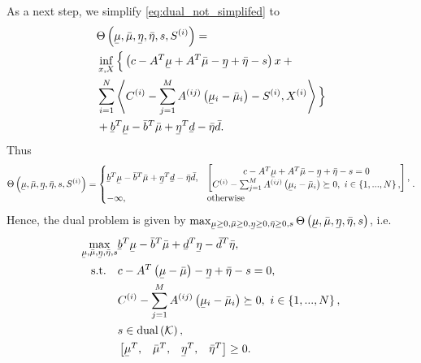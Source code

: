 \documentclass{article}
\newcommand{\f}[2]{#1\left(#2\right)}
\newcommand{\setdef}[2][]{
	\left\{
	\ifblank{#1}{}{#1 \hspace{.1cm} \middle| \hspace{.1cm}}
	#2
	\right\}
}
\newcommand{\set}[1]{\mathcal{#1}}
\newcommand{\trace}[1]{\left\langle #1\right\rangle}
\newcommand{\ubar}[1]{\underaccent{\bar}{#1}}
\begin{document}
	As a next step, we simplify \cref{eq:dual_not_simplifed} to
	\begin{equation}
		\begin{aligned}
			&\f{\Theta}{\ubar{\mu},\bar{\mu},\ubar{\eta},\bar{\eta},s,S^{(i)}} =\\
			&\inf_{x,X} \Big\{\left(c - A^T\ubar{\mu} + A^T\bar{\mu} -\ubar{\eta}+\bar{\eta} - s\right)x+ \Big.\\
			&\Big. \sum_{i=1}^{N}\trace{C^{(i)}-\sum_{j=1}^{M}A^{(ij)}\left(\ubar{\mu}_i-\bar{\mu}_i\right) -S^{(i)},X^{(i)}}\Big\}\\
			&+\ubar{b}^T\ubar{\mu} - \bar{b}^T\bar{\mu} +\ubar{\eta}^T\ubar{d}-\bar{\eta}\bar{d}.
		\end{aligned}
	\end{equation}
	Thus
	\begin{equation}
		\f{\Theta}{\ubar{\mu},\bar{\mu},\ubar{\eta},\bar{\eta},s,S^{(i)}} =
		\begin{cases}
			\ubar{b}^T\ubar{\mu} - \bar{b}^T\bar{\mu} +\ubar{\eta}^T\ubar{d}-\bar{\eta}\bar{d}, &\begin{bmatrix}
				c - A^T\ubar{\mu} + A^T\bar{\mu} -\ubar{\eta}+\bar{\eta} - s=0\\
				C^{(i)}-\sum_{j=1}^{M}A^{(ij)}\left(\ubar{\mu}_i-\bar{\mu}_i\right) \succeq 0, \ i\in\setdef{1,...,N},
			\end{bmatrix},\\
			-\infty,& \text{otherwise}
		\end{cases}.
	\end{equation}
	Hence, the dual problem is given by $\max_{\ubar{\mu}\geq 0,\bar{\mu}\geq 0,\ubar{\eta}\geq 0,\bar{\eta}\geq 0,s} \f{\Theta}{\ubar{\mu},\bar{\mu},\ubar{\eta},\bar{\eta},s}$, i.e.
	\begin{subequations}\label{eqs:SDP_dual}
		\begin{align}
			\max_{\ubar{\mu},\bar{\mu},\ubar{\eta},\bar{\eta},s} &\ubar{b}^T\ubar{\mu} - \bar{b}^T\bar{\mu} +\ubar{d}^T\ubar{\eta}-\bar{d}^T\bar{\eta},\\
			\text{s.t.} \quad 	&c - A^T\left(\ubar{\mu}-\bar{\mu}\right) -\ubar{\eta}+\bar{\eta} - s=0,\\
								&C^{(i)}-\sum_{j=1}^{M}A^{(ij)}\left(\ubar{\mu}_i-\bar{\mu}_i\right) \succeq 0, \ i\in\setdef{1,...,N},\\
								&s\in\f{\text{dual}}{\set{K}},\\
								&\begin{bmatrix}\ubar{\mu}^T,&\bar{\mu}^T,&\ubar{\eta}^T,&\bar{\eta}^T\end{bmatrix}\geq 0.
		\end{align}
	\end{subequations}
\end{document}
